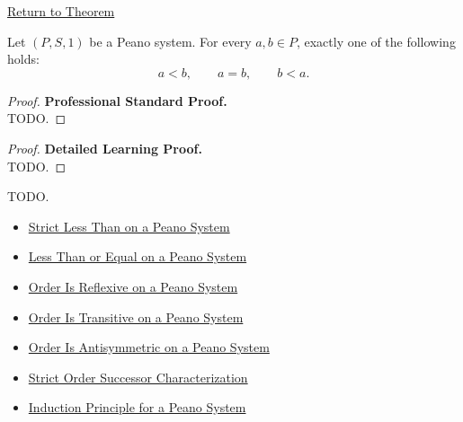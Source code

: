 \newpage
{}
\label{prf:trichotomy-on-peano-system}

\begin{remark*}[Return]
\hyperref[thm:trichotomy-on-peano-system]{Return to Theorem}
\end{remark*}

\begin{theorem*}
Let $(P,S,1)$ be a Peano system. For every $a,b \in P$, exactly one of the
following holds:
\[
a<b,\qquad a=b,\qquad b<a.
\]
\end{theorem*}

\begin{proof}
\textbf{Professional Standard Proof.}~\\
TODO.
\end{proof}

\begin{proof}
\textbf{Detailed Learning Proof.}~\\
TODO.
\end{proof}

\begin{remark*}
TODO.
\end{remark*}

\begin{dependencies}
\begin{itemize}
  \item \hyperref[def:strict-less-than-on-peano-system]{Strict Less Than on a Peano System}
  \item \hyperref[def:less-than-or-equal-on-peano-system]{Less Than or Equal on a Peano System}
  \item \hyperref[thm:order-reflexive-on-peano-system]{Order Is Reflexive on a Peano System}
  \item \hyperref[thm:order-transitive-on-peano-system]{Order Is Transitive on a Peano System}
  \item \hyperref[thm:order-antisymmetric-on-peano-system]{Order Is Antisymmetric on a Peano System}
  \item \hyperref[thm:strict-order-successor-characterization]{Strict Order Successor Characterization}
  \item \hyperref[thm:induction-principle-for-peano-system]{Induction Principle for a Peano System}
\end{itemize}
\end{dependencies}
